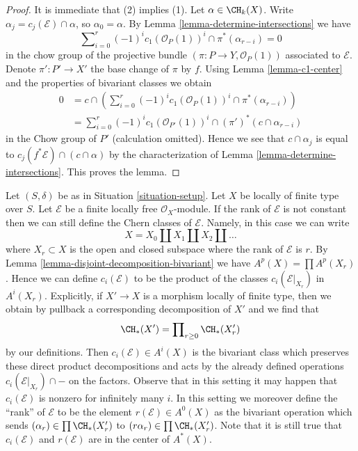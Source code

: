 \begin{proof}
It is immediate that (2) implies (1).
Let $\alpha \in \CH_k(X)$. Write $\alpha_j = c_j(\mathcal{E}) \cap \alpha$, so
$\alpha_0 = \alpha$. By Lemma \ref{lemma-determine-intersections} we have
$$
\sum\nolimits_{i = 0}^r
(-1)^i c_1(\mathcal{O}_P(1))^i \cap
\pi^*(\alpha_{r - i}) = 0
$$
in the chow group of the projective bundle
$(\pi : P \to Y, \mathcal{O}_P(1))$
associated to $\mathcal{E}$. Denote $\pi' : P' \to X'$ the base change
of $\pi$ by $f$. Using Lemma \ref{lemma-c1-center} and
the properties of bivariant classes we obtain
\begin{align*}
0 & = c \cap \left(\sum\nolimits_{i = 0}^r
(-1)^i c_1(\mathcal{O}_P(1))^i \cap
\pi^*(\alpha_{r - i})\right) \\
& =
\sum\nolimits_{i = 0}^r
(-1)^i c_1(\mathcal{O}_{P'}(1))^i \cap
(\pi')^*(c \cap \alpha_{r - i})
\end{align*}
in the Chow group of $P'$ (calculation omitted).
Hence we see that $c \cap \alpha_j$ is
equal to $c_j(f^*\mathcal{E}) \cap (c \cap \alpha)$ by the characterization
of Lemma \ref{lemma-determine-intersections}.
This proves the lemma.
\end{proof}

\begin{remark}
\label{remark-extend-to-finite-locally-free}
Let $(S, \delta)$ be as in Situation \ref{situation-setup}.
Let $X$ be locally of finite type over $S$.
Let $\mathcal{E}$ be a finite locally free $\mathcal{O}_X$-module.
If the rank of $\mathcal{E}$ is not constant then we can
still define the Chern classes of $\mathcal{E}$. Namely, in this
case we can write
$$
X = X_0 \amalg X_1 \amalg X_2 \amalg \ldots
$$
where $X_r \subset X$ is the open and closed subspace where
the rank of $\mathcal{E}$ is $r$. By 
Lemma \ref{lemma-disjoint-decomposition-bivariant}
we have $A^p(X) = \prod A^p(X_r)$.
Hence we can define $c_i(\mathcal{E})$ to be the
product of the classes $c_i(\mathcal{E}|_{X_r})$ in $A^i(X_r)$.
Explicitly, if $X' \to X$ is a morphism locally of finite type,
then we obtain by pullback a corresponding decomposition of $X'$
and we find that
$$
\CH_*(X') = \prod\nolimits_{r \geq 0} \CH_*(X'_r)
$$
by our definitions. Then $c_i(\mathcal{E}) \in A^i(X)$
is the bivariant class which preserves these direct
product decompositions and acts by the already defined
operations $c_i(\mathcal{E}|_{X_r}) \cap -$
on the factors. Observe that in this setting it may happen
that $c_i(\mathcal{E})$ is nonzero for infinitely many $i$.
In this setting we moreover define the ``rank'' of $\mathcal{E}$
to be the element $r(\mathcal{E}) \in A^0(X)$
as the bivariant operation which sends $(\alpha_r) \in \prod \CH_*(X'_r)$
to $(r\alpha_r) \in \prod \CH_*(X'_r)$.
Note that it is still true that $c_i(\mathcal{E})$ and $r(\mathcal{E})$
are in the center of $A^*(X)$.
\end{remark}


